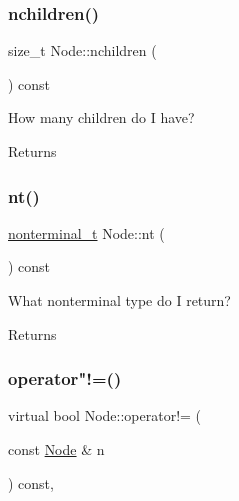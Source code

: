 \mbox{\label{class_node_a5d42219573573f6a91cdfe68fe415505}} 
\subsubsection{\texorpdfstring{nchildren()}{nchildren()}}
{\footnotesize\ttfamily size\+\_\+t Node\+::nchildren (\begin{DoxyParamCaption}{ }\end{DoxyParamCaption}) const\hspace{0.3cm}{\ttfamily [inline]}}

How many children do I have? \begin{DoxyReturn}{Returns}

\end{DoxyReturn}
\mbox{\label{class_node_a4abe3acdc804489a01ef13a25b130fd8}} 
\subsubsection{\texorpdfstring{nt()}{nt()}}
{\footnotesize\ttfamily \hyperlink{_nonterminal_8h_a5c1f658dc7560600a16d22408bd716ca}{nonterminal\+\_\+t} Node\+::nt (\begin{DoxyParamCaption}{ }\end{DoxyParamCaption}) const\hspace{0.3cm}{\ttfamily [inline]}}

What nonterminal type do I return? \begin{DoxyReturn}{Returns}

\end{DoxyReturn}
\mbox{\label{class_node_a1ff12be4d2355edddee1fbe893f0c8a8}} 
\subsubsection{\texorpdfstring{operator"!=()}{operator!=()}}
{\footnotesize\ttfamily virtual bool Node\+::operator!= (\begin{DoxyParamCaption}\item[{const \hyperlink{class_node}{Node} \&}]{n }\end{DoxyParamCaption}) const\hspace{0.3cm}{\ttfamily [inline]}, {\ttfamily [virtual]}}

